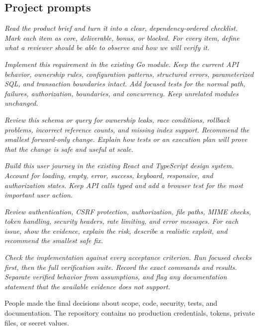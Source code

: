 \documentclass[11pt,a4paper]{article}
\begin{document}
\subsection{Project prompts}
\begin{description}[style=nextline,leftmargin=0pt,labelindent=0pt]
\item[Requirement decomposition]
\textit{Read the product brief and turn it into a clear, dependency-ordered checklist. Mark each item as core, deliverable, bonus, or blocked. For every item, define what a reviewer should be able to observe and how we will verify it.}

\item[Backend implementation]
\textit{Implement this requirement in the existing Go module. Keep the current API behavior, ownership rules, configuration patterns, structured errors, parameterized SQL, and transaction boundaries intact. Add focused tests for the normal path, failures, authorization, boundaries, and concurrency. Keep unrelated modules unchanged.}

\item[Database and scale review]
\textit{Review this schema or query for ownership leaks, race conditions, rollback problems, incorrect reference counts, and missing index support. Recommend the smallest forward-only change. Explain how tests or an execution plan will prove that the change is safe and useful at scale.}

\item[Frontend implementation]
\textit{Build this user journey in the existing React and TypeScript design system. Account for loading, empty, error, success, keyboard, responsive, and authorization states. Keep API calls typed and add a browser test for the most important user action.}

\item[Security review]
\textit{Review authentication, CSRF protection, authorization, file paths, MIME checks, token handling, security headers, rate limiting, and error messages. For each issue, show the evidence, explain the risk, describe a realistic exploit, and recommend the smallest safe fix.}

\item[Final verification]
\textit{Check the implementation against every acceptance criterion. Run focused checks first, then the full verification suite. Record the exact commands and results. Separate verified behavior from assumptions, and flag any documentation statement that the available evidence does not support.}
\end{description}

People made the final decisions about scope, code, security, tests, and documentation. The repository contains no production credentials, tokens, private files, or secret values.
\end{document}
